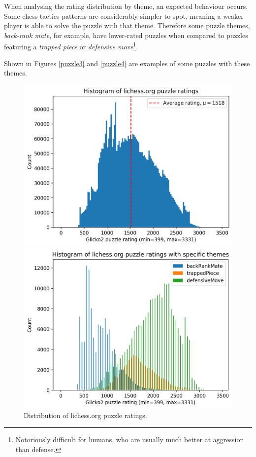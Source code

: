 When analysing the rating distribution by theme, an expected behaviour occurs.
Some chess tactics patterns are considerably simpler to spot, meaning a weaker
player is able to solve the puzzle with that theme. Therefore some puzzle
themes, \emph{back-rank mate}, for example, have lower-rated puzzles when
compared to puzzles featuring a \emph{trapped piece} or \emph{defensive
move}\footnote{Notoriously difficult for humans, who are usually much better at
aggression than defense.}.

Shown in Figures \ref{puzzle3} and \ref{puzzle4} are examples of some puzzles
with these themes.

\begin{figure}[H]
    \begin{minipage}{0.475\textwidth}
        \centering
        \includegraphics[width=\textwidth]{project/img/puzzle_histogram.png}
        \caption{Distribution of lichess.org puzzle ratings.}
        \label{dataHistogram}
    \end{minipage}
    \hspace{0.05\textwidth}
    \begin{minipage}{0.475\textwidth}
        \centering
        \includegraphics[width=\textwidth]{project/img/puzzle_theme_histograms.png}

\end{minipage}
\end{figure}
